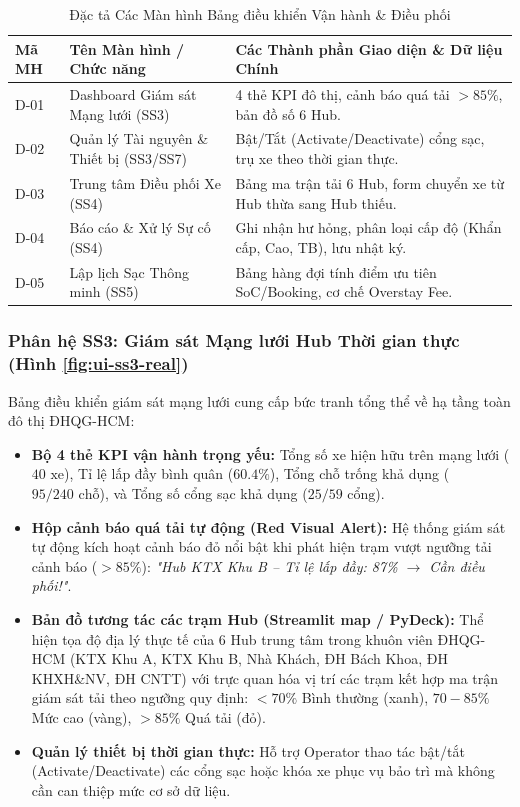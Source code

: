 \documentclass[12pt,a4paper]{article}
\begin{document}
\begin{table}[H]
    \centering
    \small
    \renewcommand{\arraystretch}{1.2}
    \caption{Đặc tả Các Màn hình Bảng điều khiển Vận hành \& Điều phối}
    \label{tab:ui-operator-screens}
    \begin{tabularx}{\textwidth}{|l|l|X|}
        \hline
        \textbf{Mã MH} & \textbf{Tên Màn hình / Chức năng} & \textbf{Các Thành phần Giao diện \& Dữ liệu Chính} \\
        \hline
        D-01 & Dashboard Giám sát Mạng lưới (SS3) & 4 thẻ KPI đô thị, cảnh báo quá tải $>85\%$, bản đồ số 6 Hub. \\
        \hline
        D-02 & Quản lý Tài nguyên \& Thiết bị (SS3/SS7) & Bật/Tắt (Activate/Deactivate) cổng sạc, trụ xe theo thời gian thực. \\
        \hline
        D-03 & Trung tâm Điều phối Xe (SS4) & Bảng ma trận tải 6 Hub, form chuyển xe từ Hub thừa sang Hub thiếu. \\
        \hline
        D-04 & Báo cáo \& Xử lý Sự cố (SS4) & Ghi nhận hư hỏng, phân loại cấp độ (Khẩn cấp, Cao, TB), lưu nhật ký. \\
        \hline
        D-05 & Lập lịch Sạc Thông minh (SS5) & Bảng hàng đợi tính điểm ưu tiên SoC/Booking, cơ chế Overstay Fee. \\
        \hline
    \end{tabularx}
\end{table}

\clearpage
\subsubsection{Phân hệ SS3: Giám sát Mạng lưới Hub Thời gian thực (Hình \ref{fig:ui-ss3-real})}
Bảng điều khiển giám sát mạng lưới cung cấp bức tranh tổng thể về hạ tầng toàn đô thị ĐHQG-HCM:
\begin{itemize}[nosep]
    \item \textbf{Bộ 4 thẻ KPI vận hành trọng yếu:} Tổng số xe hiện hữu trên mạng lưới ($40\text{ xe}$), Tỉ lệ lấp đầy bình quân ($60.4\%$), Tổng chỗ trống khả dụng ($95/240\text{ chỗ}$), và Tổng số cổng sạc khả dụng ($25/59\text{ cổng}$).
    \item \textbf{Hộp cảnh báo quá tải tự động (Red Visual Alert):} Hệ thống giám sát tự động kích hoạt cảnh báo đỏ nổi bật khi phát hiện trạm vượt ngưỡng tải cảnh báo ($> 85\%$): \textit{"Hub KTX Khu B -- Tỉ lệ lấp đầy: 87\% $\rightarrow$ Cần điều phối!"}.
    \item \textbf{Bản đồ tương tác các trạm Hub (Streamlit map / PyDeck):} Thể hiện tọa độ địa lý thực tế của 6 Hub trung tâm trong khuôn viên ĐHQG-HCM (KTX Khu A, KTX Khu B, Nhà Khách, ĐH Bách Khoa, ĐH KHXH\&NV, ĐH CNTT) với trực quan hóa vị trí các trạm kết hợp ma trận giám sát tải theo ngưỡng quy định: $<70\%$ Bình thường (xanh), $70-85\%$ Mức cao (vàng), $>85\%$ Quá tải (đỏ).
    \item \textbf{Quản lý thiết bị thời gian thực:} Hỗ trợ Operator thao tác bật/tắt (Activate/Deactivate) các cổng sạc hoặc khóa xe phục vụ bảo trì mà không cần can thiệp mức cơ sở dữ liệu.
\end{itemize}
\end{document}
